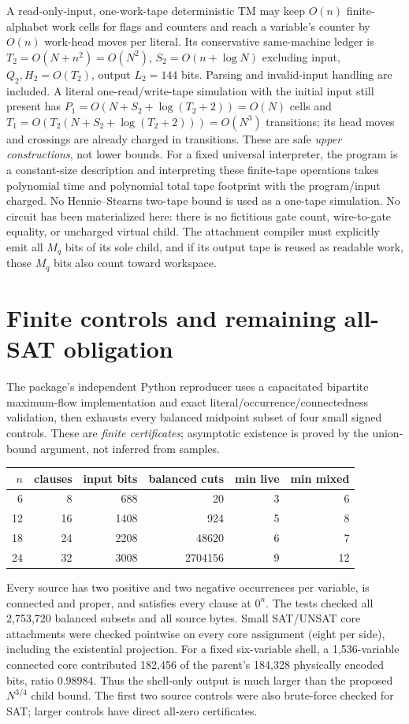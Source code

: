 \documentclass[11pt]{article}
\begin{document}
A read-only-input, one-work-tape deterministic TM may keep $O(n)$ finite-alphabet work cells for flags and counters and reach a variable's counter by $O(n)$ work-head moves per literal. Its conservative same-machine ledger is $T_2=O(N+n^2)=O(N^2)$, $S_2=O(n+\log N)$ excluding input, $Q_2,H_2=O(T_2)$, output $L_2=144$ bits. Parsing and invalid-input handling are included. A literal one-read/write-tape simulation with the initial input still present has $P_1=O(N+S_2+\log(T_2+2))=O(N)$ cells and $T_1=O(T_2(N+S_2+\log(T_2+2)))=O(N^3)$ transitions; its head moves and crossings are already charged in transitions. These are safe \emph{upper constructions}, not lower bounds. For a fixed universal interpreter, the program is a constant-size description and interpreting these finite-tape operations takes polynomial time and polynomial total tape footprint with the program/input charged. No Hennie--Stearns two-tape bound is used as a one-tape simulation. No circuit has been materialized here: there is no fictitious gate count, wire-to-gate equality, or uncharged virtual child. The attachment compiler must explicitly emit all $M_q$ bits of its sole child, and if its output tape is reused as readable work, those $M_q$ bits also count toward workspace.

\section{Finite controls and remaining all-SAT obligation}
The package's independent Python reproducer uses a capacitated bipartite maximum-flow implementation and exact literal/occurrence/connectedness validation, then exhausts every balanced midpoint subset of four small signed controls. These are \emph{finite certificates}; asymptotic existence is proved by the union-bound argument, not inferred from samples.
\begin{center}\begin{tabular}{rrrrrr}\toprule
$n$ & clauses & input bits & balanced cuts & min live & min mixed\\\midrule
6 &8&688&20&3&6\\
12&16&1408&924&5&8\\
18&24&2208&48620&6&7\\
24&32&3008&2704156&9&12\\\bottomrule
\end{tabular}\end{center}
Every source has two positive and two negative occurrences per variable, is connected and proper, and satisfies every clause at $0^n$. The tests checked all 2,753,720 balanced subsets and all source bytes. Small SAT/UNSAT core attachments were checked pointwise on every core assignment (eight per side), including the existential projection. For a fixed six-variable shell, a 1,536-variable connected core contributed 182,456 of the parent's 184,328 physically encoded bits, ratio $0.98984$. Thus the shell-only output is much larger than the proposed $N^{3/4}$ child bound. The first two source controls were also brute-force checked for SAT; larger controls have direct all-zero certificates.
\end{document}
